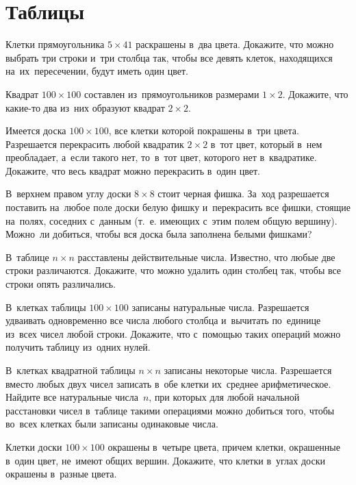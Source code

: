 

\section*{Таблицы}


\begin{problems}

\item
Клетки прямоугольника $5 \times 41$ раскрашены в~два цвета.
Докажите, что можно выбрать три строки и~три столбца так, чтобы все девять
клеток, находящихся на~их~пересечении, будут иметь один цвет.

\item
Квадрат $100 \times 100$ составлен из~прямоугольников размерами $1 \times 2$.
Докажите, что какие-то два из~них образуют квадрат $2 \times 2$.

\item
Имеется доска $100 \times 100$, все клетки которой покрашены в~три цвета.
Разрешается перекрасить любой квадратик $2 \times 2$ в~тот цвет, который в~нем
преобладает, а~если такого нет, то~в~тот цвет, которого нет в~квадратике.
Докажите, что весь квадрат можно перекрасить в~один цвет.

\item
В~верхнем правом углу доски $8 \times 8$ стоит черная фишка.
За~ход разрешается поставить на~любое поле доски белую фишку и~перекрасить все
фишки, стоящие на~полях, соседних с~данным
(т.~е. имеющих с~этим полем общую вершину).
Можно~ли добиться, чтобы вся доска была заполнена белыми фишками?

\item
В~таблице $n \times n$ расставлены действительные числа.
Известно, что любые две строки различаются.
Докажите, что можно удалить один столбец так, чтобы все строки опять
различались.

\item
В~клетках таблицы $100 \times 100$ записаны натуральные числа.
Разрешается удваивать одновременно все числа любого столбца и~вычитать
по~единице из~всех чисел любой строки.
Докажите, что с~помощью таких операций можно получить таблицу из~одних нулей.

\item
В~клетках квадратной таблицы $n \times n$ записаны некоторые числа.
Разрешается вместо любых двух чисел записать в~обе клетки их~среднее
арифметическое.
Найдите все натуральные числа~$n$, при которых для любой начальной расстановки
чисел в~таблице такими операциями можно добиться того, чтобы во~всех клетках
были записаны одинаковые числа.

\item
Клетки доски $100 \times 100$ окрашены в~четыре цвета, причем клетки,
окрашенные в~один цвет, не~имеют общих вершин.
Докажите, что клетки в~углах доски окрашены в~разные цвета.

\end{problems}

